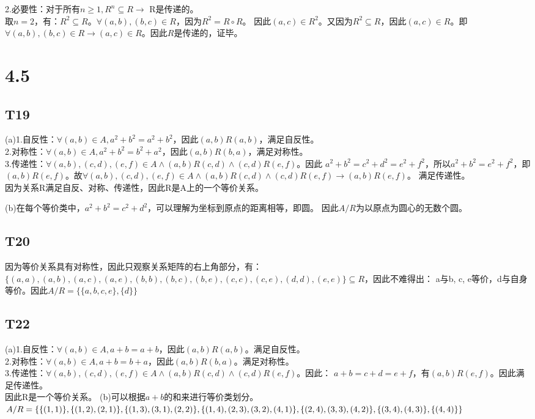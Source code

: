 \documentclass{article}
\begin{document}
2.必要性：对于所有$n \geq 1, R^n \subseteq R \rightarrow $ R是传递的。\\
取$ n = 2$，有：$R^2 \subseteq R$。$\forall (a, b), (b, c) \in R$，因为$R^2 = R \circ R$。
因此$(a, c) \in R^2$。又因为$R^2 \subseteq R$，因此$(a, c) \in R$。即$\forall (a, b) , (b, c) \in R 
\rightarrow (a, c) \in R$。因此$R$是传递的，证毕。
\section{4.5}
\subsection{T19}
(a)1.自反性：$\forall (a, b) \in A, a^2 + b ^2 = a^2 + b^2$，因此$(a, b) R (a, b)$，满足自反性。\\
2.对称性：$\forall (a, b) \in A, a^2 + b^2 = b^2 + a^2$，因此$(a, b) R (b, a)$，满足对称性。\\
3.传递性：$\forall (a, b), (c, d), (e, f) \in A \land (a, b) R (c, d) \land (c, d) R (e, f)$。因此
$a^2 + b^2 = c^2 + d^2 = e^2 + f^2$，所以$a^2 + b^2 = e^2 + f^2$，即$(a, b) R (e, f)$。故$\forall
(a, b), (c, d), (e, f) \in A \land (a, b) R (c, d) \land (c, d) R (e, f) \rightarrow (a, b) R (e, f)$。
满足传递性。\\
因为关系R满足自反、对称、传递性，因此R是A上的一个等价关系。

(b)在每个等价类中，$a^2 + b^2 = c^2 + d^2$，可以理解为坐标到原点的距离相等，即圆。
因此$A / R$为以原点为圆心的无数个圆。
\subsection{T20}
因为等价关系具有对称性，因此只观察关系矩阵的右上角部分，有：$\{(a, a), (a, b), (a, c), (a, e),
(b, b), (b, c), (b, e), (c, c), (c, e), (d, d), (e, e)\} \subseteq R$，因此不难得出：
a与b, c, e等价，d与自身等价。因此$A / R = \{\{a, b, c, e\}, \{d\}\}$
\subsection{T22}
(a)1.自反性：$\forall (a, b) \in A, a + b = a + b$，因此$(a, b) R (a, b)$。满足自反性。\\
2.对称性：$\forall (a, b) \in A, a + b = b + a$，因此$(a, b) R (b, a)$。满足对称性。\\
3.传递性：$\forall (a, b), (c, d), (e, f) \in A \land (a, b) R (c, d) \land (c, d) R (e, f)$。因此：
$a + b = c + d = e + f$，有$(a, b) R (e, f)$。因此满足传递性。\\
因此R是一个等价关系。
(b)可以根据$a + b$的和来进行等价类划分。
$A / R = \{\{(1, 1)\}, \{(1, 2), (2, 1)\}, \{(1, 3), (3, 1), (2, 2)\}, \{(1, 4), (2, 3), (3, 2), (4, 1)\}, \\
\{(2, 4), (3, 3), (4, 2)\}, \{(3, 4), (4, 3)\}, \{(4, 4)\}\}$
\end{document}
